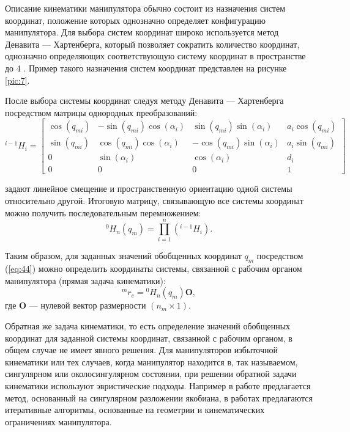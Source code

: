 \documentclass[14pt, a4paper]{extreport}
\begin{document}
Описание кинематики манипулятора обычно состоит из назначения систем координат, положение которых однозначно определяет конфигурацию манипулятора. Для выбора систем координат широко используется метод Денавита --- Хартенберга, который позволяет сократить количество координат, однозначно определяющих соответствующую систему координат в пространстве до 4 \cite{Borisov}. Пример такого назначения систем координат представлен на рисунке \ref{pic:7}. 

После выбора системы координат следуя методу Денавита --- Хартенберга посредством матрицы однородных преобразований:
\[
^{i-1}H_i =
	\begin{bmatrix}
		\cos(q_{mi}) & 	-\sin(q_{mi})\cos(\alpha_i) & 	\sin(q_{mi})\sin(\alpha_i)	&	a_i\cos(q_{mi})\\
		\sin(q_{mi}) & 	\cos(q_{mi})\cos(\alpha_i) &	-\cos(q_{mi})\sin(\alpha_i) &	a_i\sin(q_{mi})\\
		0				&	\sin(\alpha_i) 						&	\cos(\alpha_i)					& 	d_i\\
		0				&	0									&	0								&	1
	\end{bmatrix} \tag{43} \label{eq:43}
\]

\noindent
задают линейное смещение и пространственную ориентацию одной системы относительно другой. Итоговую матрицу, связывающую все системы координат можно получить последовательным перемножением:
\begin{equation}
^{0}H_n(q_{m}) = \prod_{i=1}^{n} \left(^{i-1}H_i\right).
\tag{44} \label{eq:44}
\end{equation}
\newpage

Таким образом, для заданных значений обобщенных координат $q_{m}$  посредством (\ref{eq:44}) можно определить координаты системы, связанной с рабочим органом манипулятора (прямая задача кинематики):
\begin{equation}
^mr_e = {^0H}_n(q_{m})\mathbf{O},
\tag{45} \label{eq:45}
\end{equation}
\vspace{-2mm}
\noindent
где $\mathbf{O}$ --- нулевой вектор размерности $(n_m\times 1)$. 

Обратная же задача кинематики, то есть определение значений обобщенных координат для заданной системы координат, связанной с рабочим органом, в общем случае не имеет явного решения. Для манипуляторов избыточной кинематики или тех случаев, когда манипулятор находится в, так называемом, сингулярном или околосингулярном состоянии, при решении обратной задачи кинематики используют эвристические подходы. Например в работе \cite{Buss} предлагается метод, основанный на сингулярном разложении якобиана, в работах \cite{Ben, Andreas} предлагаются итеративные алгоритмы, основанные на геометрии и кинематических ограничениях манипулятора.
\end{document}
